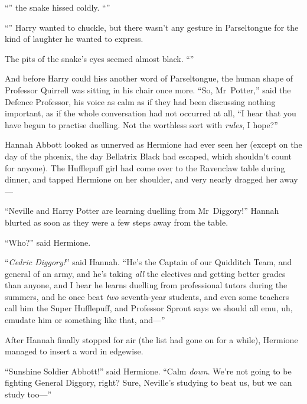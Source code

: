 “” the snake hissed coldly. “”

“” Harry wanted to chuckle, but there wasn’t any gesture in Parseltongue for the kind of laughter he wanted to express.

The pits of the snake’s eyes seemed almost black. “”

And before Harry could hiss another word of Parseltongue, the human shape of Professor Quirrell was sitting in his chair once more. “So, Mr~Potter,” said the Defence Professor, his voice as calm as if they had been discussing nothing important, as if the whole conversation had not occurred at all, “I hear that you have begun to practise duelling. Not the worthless sort with \emph{rules}, I hope?”

\later

Hannah Abbott looked as unnerved as Hermione had ever seen her (except on the day of the phœnix, the day Bellatrix Black had escaped, which shouldn’t count for anyone). The Hufflepuff girl had come over to the Ravenclaw table during dinner, and tapped Hermione on her shoulder, and very nearly dragged her away—

“Neville and Harry Potter are learning duelling from Mr~Diggory!” Hannah blurted as soon as they were a few steps away from the table.

“Who?” said Hermione.

“\emph{Cedric Diggory!}” said Hannah. “He’s the Captain of our Quidditch Team, and general of an army, and he’s taking \emph{all} the electives and getting better grades than anyone, and I hear he learns duelling from professional tutors during the summers, and he once beat \emph{two} seventh-year students, and even some teachers call him the Super Hufflepuff, and Professor Sprout says we should all emu, uh, emudate him or something like that, and—”

After Hannah finally stopped for air (the list had gone on for a while), Hermione managed to insert a word in edgewise.

“Sunshine Soldier Abbott!” said Hermione. “Calm \emph{down}. We’re not going to be fighting General Diggory, right? Sure, Neville’s studying to beat us, but we can study too—”

